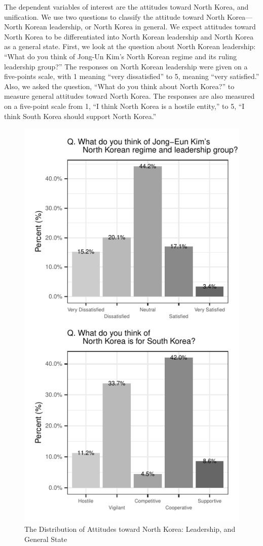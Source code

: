\documentclass[letterpaper,9pt,twocolumn,twoside,]{pinp}
\begin{document}
The dependent variables of interest are the attitudes toward North
Korea, and unification. We use two questions to classify the attitude
toward North Korea---North Korean leadership, or North Korea in general.
We expect attitudes toward North Korea to be differentiated into North
Korean leadership and North Korea as a general state. First, we look at
the question about North Korean leadership: ``What do you think of
Jong-Un Kim's North Korean regime and its ruling leadership group?'' The
responses on North Korean leadership were given on a five-points scale,
with 1 meaning ``very dissatisfied'' to 5, meaning ``very satisfied.''
Also, we asked the question, ``What do you think about North Korea?'' to
measure general attitudes toward North Korea. The responses are also
measured on a five-point scale from 1, ``I think North Korea is a
hostile entity,'' to 5, ``I think South Korea should support North
Korea.''

\begin{figure}[ht]

{\centering \includegraphics{manuscript_files/figure-latex/fig3-1} 

}

\caption{\label{fig3} The Distribution of Attitudes toward North Korea: Leadership, and General State}\label{fig:fig3}
\end{figure}
\end{document}
